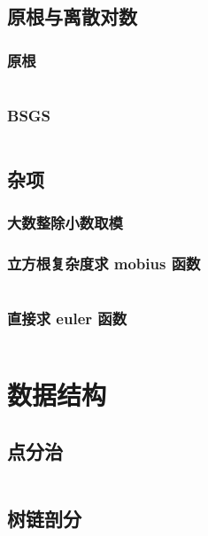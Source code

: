 \documentclass[a4paper, twoside]{article}
\begin{document}
\begin{multicols}{2}
			\subsection{原根与离散对数}
				\subsubsection{原根}
					\inputminted{cpp}{../src-midori/number/原根.cpp}
				\subsubsection{BSGS}
					\inputminted{cpp}{../src-midori/number/bsgs.cpp}
			

			\subsection{杂项}
				\subsubsection{大数整除小数取模}
					
				\subsubsection{立方根复杂度求 mobius 函数}
					\inputminted{cpp}{../src-midori/number/立方根求mu.cpp}
				\subsubsection{直接求 euler 函数}
					\inputminted{cpp}{../src-midori/number/直接求phi.cpp}
		
		\newpage
		\section{数据结构}
			\subsection{点分治}
				\inputminted{cpp}{../src-midori/datastructure/点分治.cpp}
			
			\subsection{树链剖分}
				\inputminted{cpp}{../src-midori/datastructure/树链剖分.cpp}
			

\end{multicols}
\end{document}
